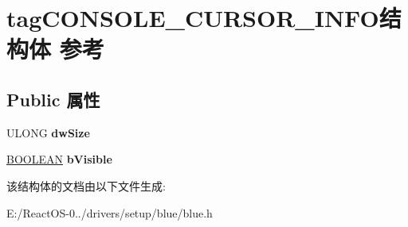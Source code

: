\hypertarget{structtag_c_o_n_s_o_l_e___c_u_r_s_o_r___i_n_f_o}{}\section{tag\+C\+O\+N\+S\+O\+L\+E\+\_\+\+C\+U\+R\+S\+O\+R\+\_\+\+I\+N\+F\+O结构体 参考}
\label{structtag_c_o_n_s_o_l_e___c_u_r_s_o_r___i_n_f_o}
\subsection*{Public 属性}
\begin{DoxyCompactItemize}
\item 
\mbox{\label{structtag_c_o_n_s_o_l_e___c_u_r_s_o_r___i_n_f_o_ae144ef2a8c070b668eecd47f605c57ed}} 
U\+L\+O\+NG {\bfseries dw\+Size}
\item 
\mbox{\label{structtag_c_o_n_s_o_l_e___c_u_r_s_o_r___i_n_f_o_a063fc6002711db82ccdeced96f0ef98b}} 
\hyperlink{_processor_bind_8h_a112e3146cb38b6ee95e64d85842e380a}{B\+O\+O\+L\+E\+AN} {\bfseries b\+Visible}
\end{DoxyCompactItemize}


该结构体的文档由以下文件生成\+:\begin{DoxyCompactItemize}
\item 
E\+:/\+React\+O\+S-\/0../drivers/setup/blue/blue.\+h\end{DoxyCompactItemize}
